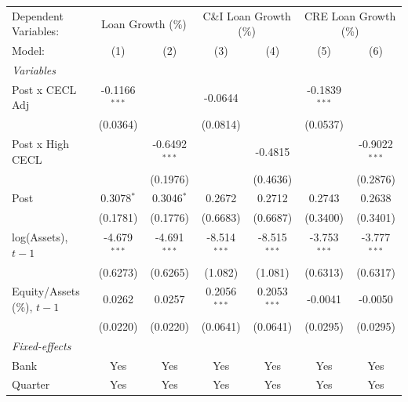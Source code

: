 
\begingroup
\centering
\begin{tabular}{lcccccc}
   \tabularnewline \midrule \midrule
   Dependent Variables: & \multicolumn{2}{c}{Loan Growth (\%)} & \multicolumn{2}{c}{C\&I Loan Growth (\%)} & \multicolumn{2}{c}{CRE Loan Growth (\%)}\\
   Model:                       & (1)             & (2)             & (3)            & (4)            & (5)             & (6)\\  
   \midrule
   \emph{Variables}\\
   Post x CECL Adj              & -0.1166$^{***}$ &                 & -0.0644        &                & -0.1839$^{***}$ &   \\   
                                & (0.0364)        &                 & (0.0814)       &                & (0.0537)        &   \\   
   Post x High CECL             &                 & -0.6492$^{***}$ &                & -0.4815        &                 & -0.9022$^{***}$\\   
                                &                 & (0.1976)        &                & (0.4636)       &                 & (0.2876)\\   
   Post                         & 0.3078$^{*}$    & 0.3046$^{*}$    & 0.2672         & 0.2712         & 0.2743          & 0.2638\\   
                                & (0.1781)        & (0.1776)        & (0.6683)       & (0.6687)       & (0.3400)        & (0.3401)\\   
   log(Assets), $t{-}1$         & -4.679$^{***}$  & -4.691$^{***}$  & -8.514$^{***}$ & -8.515$^{***}$ & -3.753$^{***}$  & -3.777$^{***}$\\   
                                & (0.6273)        & (0.6265)        & (1.082)        & (1.081)        & (0.6313)        & (0.6317)\\   
   Equity/Assets (\%), $t{-}1$  & 0.0262          & 0.0257          & 0.2056$^{***}$ & 0.2053$^{***}$ & -0.0041         & -0.0050\\   
                                & (0.0220)        & (0.0220)        & (0.0641)       & (0.0641)       & (0.0295)        & (0.0295)\\   
   \midrule
   \emph{Fixed-effects}\\
   Bank                         & Yes             & Yes             & Yes            & Yes            & Yes             & Yes\\  
   Quarter                      & Yes             & Yes             & Yes            & Yes            & Yes             & Yes\\  

\end{tabular}

